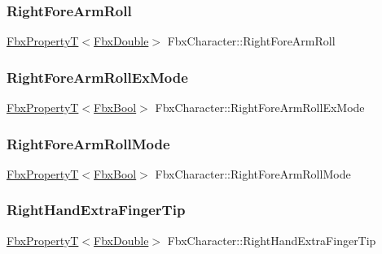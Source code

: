 \subsubsection{\texorpdfstring{Right\+Fore\+Arm\+Roll}{RightForeArmRoll}}
{\footnotesize\ttfamily \hyperlink{class_fbx_property_t}{Fbx\+PropertyT}$<$\hyperlink{fbxtypes_8h_a171e72a1c46fc15c1a6c9c31948c1c5b}{Fbx\+Double}$>$ Fbx\+Character\+::\+Right\+Fore\+Arm\+Roll}

\mbox{\label{class_fbx_character_a49775ba6e1428e6be008feeeed7cc516}} 
\subsubsection{\texorpdfstring{Right\+Fore\+Arm\+Roll\+Ex\+Mode}{RightForeArmRollExMode}}
{\footnotesize\ttfamily \hyperlink{class_fbx_property_t}{Fbx\+PropertyT}$<$\hyperlink{fbxtypes_8h_a92e0562b2fe33e76a242f498b362262e}{Fbx\+Bool}$>$ Fbx\+Character\+::\+Right\+Fore\+Arm\+Roll\+Ex\+Mode}

\mbox{\label{class_fbx_character_ada8eaa6dbd3161bfbb6a057116364d55}} 
\subsubsection{\texorpdfstring{Right\+Fore\+Arm\+Roll\+Mode}{RightForeArmRollMode}}
{\footnotesize\ttfamily \hyperlink{class_fbx_property_t}{Fbx\+PropertyT}$<$\hyperlink{fbxtypes_8h_a92e0562b2fe33e76a242f498b362262e}{Fbx\+Bool}$>$ Fbx\+Character\+::\+Right\+Fore\+Arm\+Roll\+Mode}

\mbox{\label{class_fbx_character_aac0b926d798f6d825aa3b00aa34001ba}} 
\subsubsection{\texorpdfstring{Right\+Hand\+Extra\+Finger\+Tip}{RightHandExtraFingerTip}}
{\footnotesize\ttfamily \hyperlink{class_fbx_property_t}{Fbx\+PropertyT}$<$\hyperlink{fbxtypes_8h_a171e72a1c46fc15c1a6c9c31948c1c5b}{Fbx\+Double}$>$ Fbx\+Character\+::\+Right\+Hand\+Extra\+Finger\+Tip}


